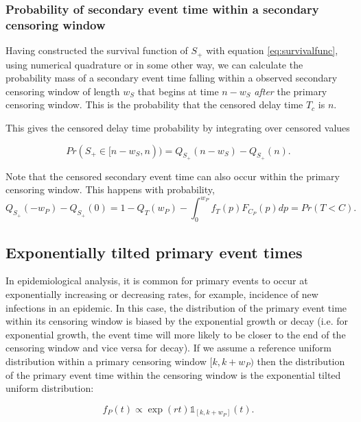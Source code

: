\documentclass[10pt,letterpaper]{article}
\begin{document}
\subsubsection{Probability of secondary event time within a secondary censoring window}

Having constructed the survival function of $S_+$ with equation \ref{eq:survivalfunc}, using numerical quadrature or in some other way, we can calculate the probability mass of a secondary event time falling within a observed secondary censoring window of length $w_S$ that begins at time $n - w_S$ \textit{after} the primary censoring window. This is the probability that the censored delay time $T_c$ is $n$.

This gives the censored delay time probability by integrating over censored values

\begin{equation}
\label{eq:seccensorprob}
Pr(S_+ \in [n - w_S, n)) = Q_{S_+}(n-w_S) - Q_{S_+}(n).
\end{equation}


Note that the censored secondary event time can also occur within the primary censoring window. This happens with probability,
\begin{equation}
Q_{S_+}(-w_P) - Q_{S_+}(0) = 1 - Q_T(w_P) - \int_0^{w_P} f_T(p) F_{C_P}(p) dp = Pr(T< C).
\end{equation}

\subsection{Exponentially tilted primary event times}
In epidemiological analysis, it is common for primary events to occur at exponentially increasing or decreasing rates, for example, incidence of new infections in an epidemic. In this case, the distribution of the primary event time within its censoring window is biased by the exponential growth or decay \cite{Park2024.01.12.24301247} (i.e. for exponential growth, the event time will more likely to be closer to the end of the censoring window and vice versa for decay). If we assume a reference uniform distribution within a primary censoring window $[k, k + w_P)$ then the distribution of the primary event time within the censoring window is the exponential tilted uniform distribution:

\begin{equation}
f_P(t) \propto \exp(r t) \mathbb{1}_{[k, k + w_P]}(t).
\end{equation}
\end{document}
